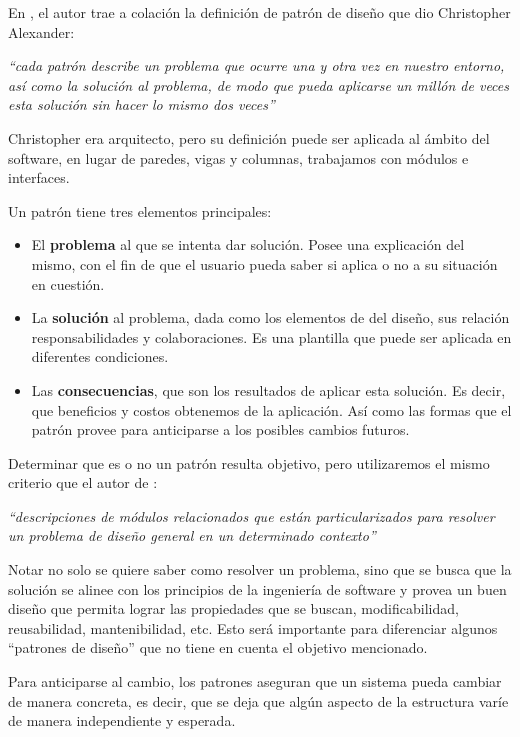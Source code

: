 En \cite{Gamma:1995:DPE:186897}, el autor trae a colación la definición de patrón de diseño que dio Christopher Alexander:

\textit{``cada patrón describe un problema que ocurre una y otra vez en nuestro entorno, así como la solución al problema, de modo que pueda aplicarse un millón de veces esta solución sin hacer lo mismo dos veces''}

Christopher era arquitecto, pero su definición puede ser aplicada al ámbito del software, en lugar de paredes, vigas y columnas, trabajamos con módulos e interfaces.

Un patrón tiene tres elementos principales:

\begin{itemize}
	\item El \textbf{problema} al que se intenta dar solución. Posee una explicación del mismo, con el fin de que el usuario pueda saber si aplica o no a su situación en cuestión.
	\item La \textbf{solución} al problema, dada como los elementos de del diseño, sus relación responsabilidades y colaboraciones. Es una plantilla que puede ser aplicada en diferentes condiciones.
	\item Las \textbf{consecuencias}, que son los resultados de aplicar esta solución. Es decir, que beneficios y costos obtenemos de la aplicación. Así como las formas que el patrón provee para anticiparse a los posibles cambios futuros.
\end{itemize}

Determinar que es o no un patrón resulta objetivo, pero utilizaremos el mismo criterio que el autor de \cite{Gamma:1995:DPE:186897}:

\textit{``descripciones de módulos relacionados que están particularizados para resolver un problema de diseño general en un determinado contexto''}

Notar no solo se quiere saber como resolver un problema, sino que se busca que la solución se alinee con los principios de la ingeniería de software y provea un buen diseño que permita lograr las propiedades que se buscan, modificabilidad, reusabilidad, mantenibilidad, etc. Esto será importante para diferenciar algunos ``patrones de diseño'' que no tiene en cuenta el objetivo mencionado.

Para anticiparse al cambio, los patrones aseguran que un sistema pueda cambiar de manera concreta, es decir, que se deja que algún aspecto de la estructura varíe de manera independiente y esperada.


